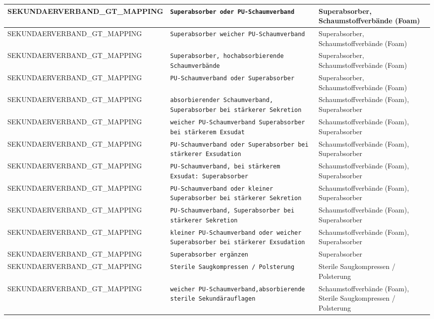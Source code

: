\begin{longtable}{|p{3.5cm}|p{5cm}|p{6.5cm}|}
SEKUNDAERVERBAND\_GT\_MAPPING & \texttt{Superabsorber oder PU-Schaumverband} & Superabsorber, Schaumstoffverbände (Foam) \\ \hline
SEKUNDAERVERBAND\_GT\_MAPPING & \texttt{Superabsorber weicher PU-Schaumverband} & Superabsorber, Schaumstoffverbände (Foam) \\ \hline
SEKUNDAERVERBAND\_GT\_MAPPING & \texttt{Superabsorber, hochabsorbierende Schaumverbände} & Superabsorber, Schaumstoffverbände (Foam) \\ \hline
SEKUNDAERVERBAND\_GT\_MAPPING & \texttt{PU-Schaumverband oder Superabsorber} & Superabsorber, Schaumstoffverbände (Foam) \\ \hline
SEKUNDAERVERBAND\_GT\_MAPPING & \texttt{absorbierender Schaumverband, Superabsorber bei stärkerer Sekretion} & Schaumstoffverbände (Foam), Superabsorber \\ \hline
SEKUNDAERVERBAND\_GT\_MAPPING & \texttt{weicher PU-Schaumverband Superabsorber bei stärkerem Exsudat} & Schaumstoffverbände (Foam), Superabsorber \\ \hline
SEKUNDAERVERBAND\_GT\_MAPPING & \texttt{PU-Schaumverband oder Superabsorber bei stärkerer Exsudation} & Schaumstoffverbände (Foam), Superabsorber \\ \hline
SEKUNDAERVERBAND\_GT\_MAPPING & \texttt{PU-Schaumverband, bei stärkerem Exsudat: Superabsorber} & Schaumstoffverbände (Foam), Superabsorber \\ \hline
SEKUNDAERVERBAND\_GT\_MAPPING & \texttt{PU-Schaumverband oder kleiner Superabsorber bei stärkerer Sekretion} & Schaumstoffverbände (Foam), Superabsorber \\ \hline
SEKUNDAERVERBAND\_GT\_MAPPING & \texttt{PU-Schaumverband, Superabsorber bei stärkerer Sekretion} & Schaumstoffverbände (Foam), Superabsorber \\ \hline
SEKUNDAERVERBAND\_GT\_MAPPING & \texttt{kleiner PU-Schaumverband oder weicher Superabsorber bei stärkerer Exsudation} & Schaumstoffverbände (Foam), Superabsorber \\ \hline
SEKUNDAERVERBAND\_GT\_MAPPING & \texttt{Superabsorber ergänzen} & Superabsorber \\ \hline
SEKUNDAERVERBAND\_GT\_MAPPING & \texttt{Sterile Saugkompressen / Polsterung} & Sterile Saugkompressen / Polsterung \\ \hline
SEKUNDAERVERBAND\_GT\_MAPPING & \texttt{weicher PU-Schaumverband,absorbierende sterile Sekundärauflagen} & Schaumstoffverbände (Foam), Sterile Saugkompressen / Polsterung \\ \hline

\end{longtable}
